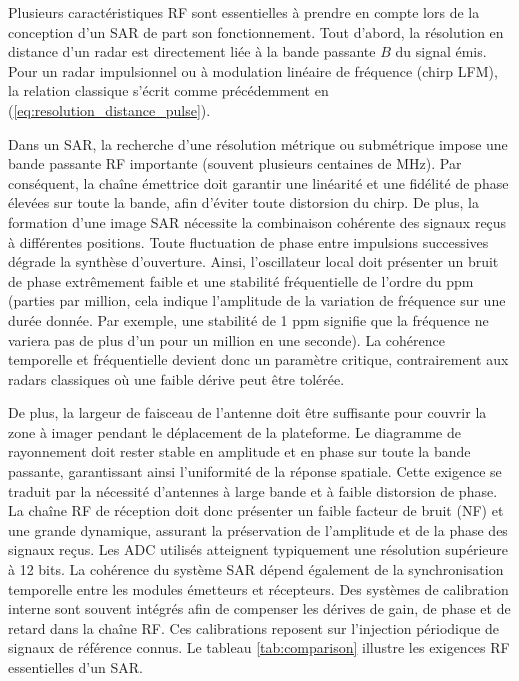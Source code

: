 Plusieurs caractéristiques RF sont essentielles à prendre en compte lors de la conception d'un SAR de part son fonctionnement. Tout d'abord, la résolution en distance d’un radar est directement liée à la bande passante $B$ du signal émis. Pour un radar impulsionnel ou à modulation linéaire de fréquence (chirp LFM), la relation classique s’écrit comme précédemment en  (\ref{eq:resolution_distance_pulse}).



Dans un SAR, la recherche d’une résolution métrique ou submétrique impose une bande passante RF importante (souvent plusieurs centaines de MHz). Par conséquent, la chaîne émettrice doit garantir une linéarité et une fidélité de phase élevées sur toute la bande, afin d’éviter toute distorsion du chirp. De plus, la formation d’une image SAR nécessite la combinaison cohérente des signaux reçus à différentes positions. Toute fluctuation de phase entre impulsions successives dégrade la synthèse d’ouverture. Ainsi, l’oscillateur local doit présenter un bruit de phase extrêmement faible et une stabilité fréquentielle de l’ordre du ppm (parties par million, cela indique l'amplitude de la variation de fréquence sur une durée donnée. Par exemple, une stabilité de 1 ppm signifie que la fréquence ne variera pas de plus d'un pour un million en une seconde). La cohérence temporelle et fréquentielle devient donc un paramètre critique, contrairement aux radars classiques où une faible dérive peut être tolérée.

De plus, la largeur de faisceau de l’antenne doit être suffisante pour couvrir la zone à imager pendant le déplacement de la plateforme. Le diagramme de rayonnement doit rester stable en amplitude et en phase sur toute la bande passante, garantissant ainsi l’uniformité de la réponse spatiale. Cette exigence se traduit par la nécessité d’antennes à large bande et à faible distorsion de phase. La chaîne RF de réception doit donc présenter un faible facteur de bruit (NF) et une grande dynamique, assurant la préservation de l’amplitude et de la phase des signaux reçus. Les ADC utilisés atteignent typiquement une résolution supérieure à 12 bits. La cohérence du système SAR dépend également de la synchronisation temporelle entre les modules émetteurs et récepteurs. Des systèmes de calibration interne sont souvent intégrés afin de compenser les dérives de gain, de phase et de retard dans la chaîne RF. Ces calibrations reposent sur l’injection périodique de signaux de référence connus. Le tableau \ref{tab:comparison} illustre les exigences RF essentielles d'un SAR.

